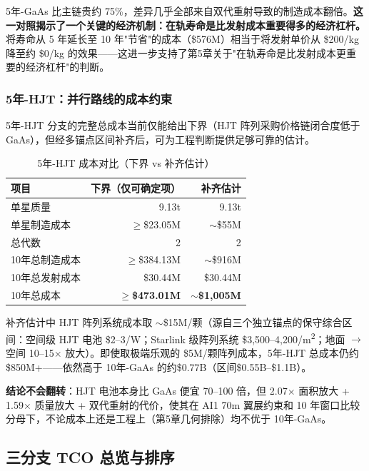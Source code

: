 5年-GaAs 比主链贵约 75\%，差异几乎全部来自双代重射导致的制造成本翻倍。\textbf{这一对照揭示了一个关键的经济机制：在轨寿命是比发射成本重要得多的经济杠杆。} 将寿命从 5 年延长至 10 年"节省"的成本（\$576M）相当于将发射单价从 \$200/kg 降至约 \$0/kg 的效果——这进一步支持了第5章关于"在轨寿命是比发射成本更重要的经济杠杆"的判断。

\subsubsection{5年-HJT：并行路线的成本约束}

5年-HJT 分支的完整总成本当前仅能给出下界（HJT 阵列采购价格链闭合度低于 GaAs），但经多锚点区间补齐后，可为工程判断提供足够可靠的估计。

\begin{table}[H]
\centering
\caption{5年-HJT 成本对比（下界 vs 补齐估计）}
\label{tab:hjt5_tco}
\begin{tabular}{p{5.0cm}rr}
\toprule
\textbf{项目} & \textbf{下界（仅可确定项）} & \textbf{补齐估计} \\
\midrule
单星质量              & 9.13\;t              & 9.13\;t \\
单星制造成本          & $\ge$\$23.05M       & $\sim$\$55M \\
总代数                & 2                    & 2 \\
10年总制造成本        & $\ge$\$384.13M      & $\sim$\$916M \\
10年总发射成本        & \$30.44M             & \$30.44M \\
10年总成本            & \textbf{$\ge$\$473.01M} & \textbf{$\sim$\$1,005M} \\
\bottomrule
\end{tabular}
\end{table}

补齐估计中 HJT 阵列系统成本取 $\sim$\$15M/颗（源自三个独立锚点的保守综合区间：空间级 HJT 电池 \$2--3/W；Starlink 级阵列系统 \$3,500--4,200/m\textsuperscript{2}；地面 $\to$ 空间 10--15$\times$ 放大）。即使取极端乐观的 \$5M/颗阵列成本，5年-HJT 总成本仍约 \$850M+——依然高于 10年-GaAs 的约\$0.77B（区间\$0.55B--\$1.1B）。

\textbf{结论不会翻转}：HJT 电池本身比 GaAs 便宜 70--100 倍，但 2.07$\times$ 面积放大 + 1.59$\times$ 质量放大 + 双代重射的代价，使其在 AI1 70\;m 翼展约束和 10 年窗口比较分母下，不论成本上还是工程上（第5章几何排除）均不优于 10年-GaAs。

\subsection{三分支 TCO 总览与排序}

